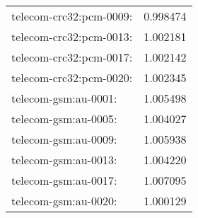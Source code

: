 \begin{longtable}{lr}
telecom-crc32:pcm-0009: & 0.998474 \\
telecom-crc32:pcm-0013: & 1.002181 \\
telecom-crc32:pcm-0017: & 1.002142 \\
telecom-crc32:pcm-0020: & 1.002345 \\
telecom-gsm:au-0001: & 1.005498 \\
telecom-gsm:au-0005: & 1.004027 \\
telecom-gsm:au-0009: & 1.005938 \\
telecom-gsm:au-0013: & 1.004220 \\
telecom-gsm:au-0017: & 1.007095 \\
telecom-gsm:au-0020: & 1.000129 \\
\end{longtable}
